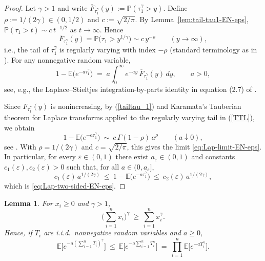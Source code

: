 \documentclass[preprint]{imsart}
\newcommand{\PP}{\mathbb{P}}
\newcommand{\EE}{\mathbb{E}}
\newcommand{\1}{\mathbf{1}}
\theoremstyle{plain}
\newtheorem{lemma}[theorem]{Lemma}
\theoremstyle{definition}
\begin{document}
\begin{proof} Let \(\gamma>1\) and write \(\overline F_{\tau_1^\gamma}(y):=\PP(\tau_1^\gamma>y)\). Define \(\rho:=1/(2\gamma)\in(0,1/2)\) and \(c:=\sqrt{2/\pi}\). By Lemma~\ref{lem:tail-tau1-EN-eps}, \(\PP(\tau_1>t)\sim c\,t^{-1/2}\) as \(t\to\infty\). Hence
\begin{equation}\label{tailtau_1}
\overline F_{\tau_1^\gamma}(y)=\PP\!\big(\tau_1>y^{1/\gamma}\big)\sim c\,y^{-\rho}\qquad(y\to\infty),
\end{equation}
i.e., the tail of \(\tau_1^\gamma\) is regularly varying with index \(-\rho\) (standard terminology as in \cite[Ch.~1]{BGT1987}). For any nonnegative random variable,
\begin{equation}\label{TTL}
1-\EE\!\big(e^{-a\tau_1^\gamma}\big)\;=\;a\int_{0}^{\infty} e^{-ay}\,\overline F_{\tau_1^\gamma}(y)\,dy,\qquad a>0,
\end{equation}
see, e.g., the Laplace–Stieltjes integration-by-parts identity in equation (2.7) of \cite[Ch.~XIII]{Feller1971}.

Since \(F_{\tau_1^\gamma}(y)\) is nonincreasing, by (\ref{tailtau_1}) and Karamata’s Tauberian theorem for Laplace transforms applied to the regularly varying tail in (\ref{TTL}), we obtain
\[
1-\EE\!\big(e^{-a\tau_1^\gamma}\big)\ \sim\ c\,\Gamma(1-\rho)\,a^{\rho}\qquad(a\downarrow0),
\]
see \cite[Th.4,Ch. XIII.5]{Feller68}. With \(\rho=1/(2\gamma)\) and \(c=\sqrt{2/\pi}\), this gives the limit \eqref{eq:Lap-limit-EN-eps}.
In particular, for every \(\varepsilon\in(0,1)\) there exist \(a_\varepsilon\in(0,1)\) and constants \(c_1(\varepsilon),c_2(\varepsilon)>0\) such that, for all \(a\in(0,a_\varepsilon]\),
\[
c_1(\varepsilon)\,a^{1/(2\gamma)}\ \le\ 1-\EE\!\big(e^{-a\tau_1^\gamma}\big)\ \le\ c_2(\varepsilon)\,a^{1/(2\gamma)},
\]
which is \eqref{eq:Lap-two-sided-EN-eps}.
\end{proof}



\begin{lemma}\label{lem:convex-ineq-EN-eps}
For $x_i\ge 0$ and $\gamma> 1$,
\begin{equation}\label{eq:superadd}
\Big(\sum_{i=1}^n x_i\Big)^{\gamma}\ \ge\ \sum_{i=1}^n x_i^{\gamma}.
\end{equation}
Hence, if $T_i$ are i.i.d.\ nonnegative random variables and $a\ge0$,
\begin{equation}\label{eq:prod-bound-EN-eps}
\EE\!\big[e^{-a(\sum_{i=1}^n T_i)^\gamma}\big]
\ \le\ \EE\!\big[e^{-a\sum_{i=1}^n T_i^\gamma}\big]
\ =\ \prod_{i=1}^n \EE\!\big[e^{-a T_i^\gamma}\big].
\end{equation}
\end{lemma}
\end{document}
